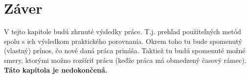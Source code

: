 \chapter*{Záver}  %

V tejto kapitole budú zhrnuté výsledky práce. T.j. prehľad použiteľných metód spolu s ich výsledkom praktického porovnania.
Okrem toho tu bude spomenutý (vlastný) prínos, čo nové daná práca prináša.
Taktiež tu budú spomenuté možné smery, ktorými možno rozšíriť prácu (keďže práca má obmedzený časový rámec).\\

\textbf{Táto kapitola je nedokončená.}